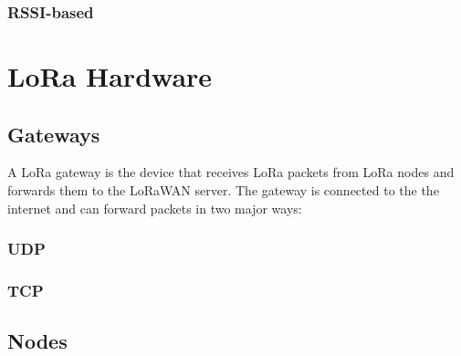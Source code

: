 \subsubsection{\ac{RSSI}-based}

\section{\ac{LoRa} Hardware}

\subsection{Gateways}

A \ac{LoRa} gateway is the device that receives \ac{LoRa} packets from \ac{LoRa} nodes and forwards them to the \ac{LoRaWAN} server.
The gateway is connected to the the internet and can forward packets in two major ways:

\subsubsection{\ac{UDP}}

\subsubsection{\ac{TCP}}

\subsection{Nodes}